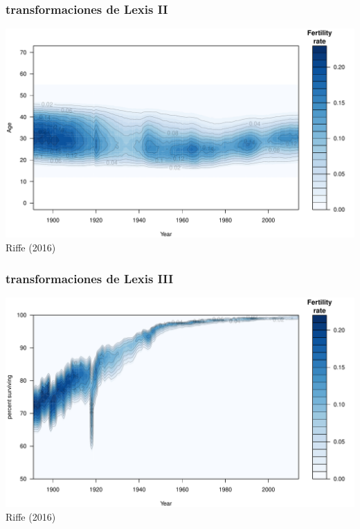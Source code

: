 \documentclass[20pt]{beamer}
\begin{document}
\begin{frame}
\frametitle{transformaciones de Lexis II}
\includegraphics[scale=.9]{Figures/FertAPC.pdf}\\
Riffe (2016)
\end{frame}

\begin{frame}
\frametitle{transformaciones de Lexis III}
\includegraphics[scale=.9]{Figures/FertQuant.pdf}\\
Riffe (2016)
\end{frame}

\end{document}
